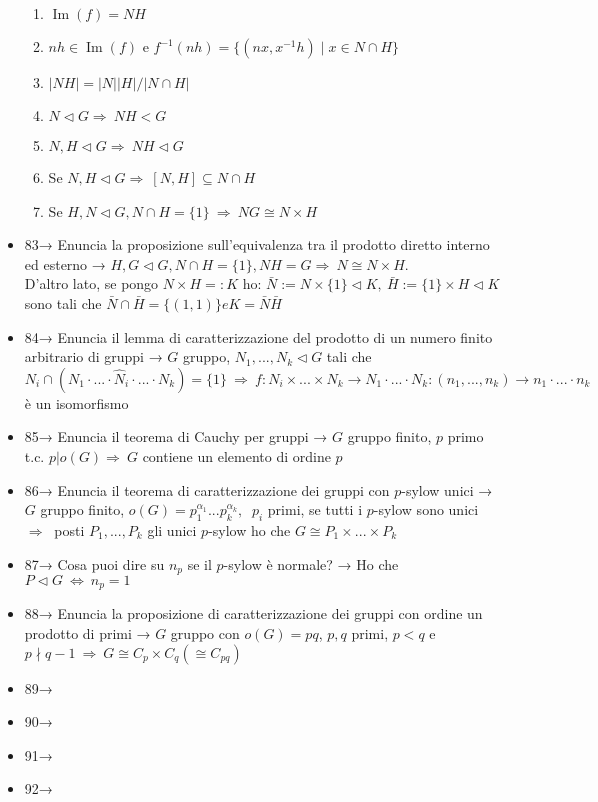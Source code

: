 \documentclass[A4,12pt]{article}
\newcommand{\then}{\Rightarrow}
\renewcommand{\iff}{\Leftrightarrow}
\newcommand{\psy}{$ p $-sylow }
\begin{document}
\begin{itemize}[noitemsep]
\begin{enumerate}[noitemsep]
			\item $\operatorname{Im}(f) = NH  $
			\item $ nh\in \operatorname{Im}(f) $ e $ f^{-1}(nh)=\{(nx,x^{-1}h)\mid x\in N\cap H \} $
			\item $ |NH| = |N||H|/|N\cap H| $
			\item $ N\lhd G\then\ NH<G $
			\item $ N,H\lhd G\then\ NH\lhd G $
			\item Se $ N,H\lhd G\then\ [N,H]\subseteq N\cap H $
			\item Se $ H,N\lhd G, N\cap H = \{1\}\ \then\ NG\cong N\times H $
		\end{enumerate}
		\item 83→ Enuncia la proposizione sull'equivalenza tra il prodotto diretto interno ed esterno → $ H,G\lhd G, N\cap H = \{1\}, NH = G\then\ N\cong N\times H $.\\ D'altro lato, se pongo $ N\times H=: K  $ ho: $ \bar N := N\times \{1\} \lhd K,\ \bar H :=\{1\}\times H\lhd K $ sono tali che $ \bar N \cap \bar H = \{(1,1)\} e K=\bar N \bar H $
		\item 84→ Enuncia il lemma di caratterizzazione del prodotto di un numero finito arbitrario di gruppi → $ G $ gruppo, $ N_1,...,N_k\lhd G $ tali che $ N_i \cap (N_1\cdot ... \cdot \hat N_i \cdot ... \cdot N_k)  = \{1\}\ \then\ f:N_i\times ...\times N_k \to N_1 \cdot ... \cdot N_k : (n_1, ..., n_k)\to n_1\cdot ...\cdot n_k  $ è un isomorfismo
		\item 85→ Enuncia il teorema di Cauchy per gruppi → $ G $ gruppo finito, $  p $ primo t.c. $ p| o(G)\then\ G $ contiene un elemento di ordine $ p $ 
		\item 86→ Enuncia il teorema di caratterizzazione dei gruppi con \psy unici → $ G  $ gruppo finito, $ o(G)= p_1^{\alpha_1}...p_k^{\alpha_k},$  $\ p_i $ primi, se tutti i \psy sono unici $ \then\ $ posti $ P_1,...,P_k $ gli unici \psy ho che $ G \cong P_1\times...\times P_k $
		\item 87→ Cosa puoi dire su $ n_p  $ se il \psy è normale? → Ho che $ P\lhd G\ \iff\ n_p = 1$
		\item 88→ Enuncia la proposizione di caratterizzazione dei gruppi con ordine un prodotto di primi → $ G $ gruppo con $ o(G) = pq $, $p,q$ primi, $ p<q$ e $ p\nmid q-1\ \then\  G\cong C_p\times C_q (\cong C_{pq})$
		\item 89→ 
		\item 90→ 
		\item 91→ 
		\item 92→ 

\end{itemize}
\end{document}
